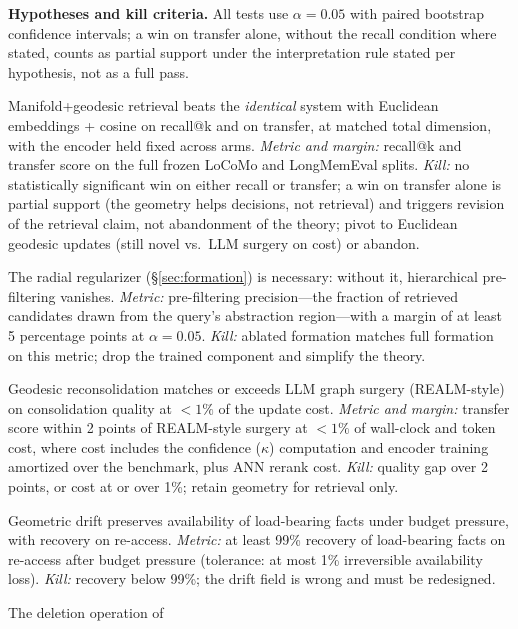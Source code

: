 \documentclass[11pt,a4paper]{article}
\begin{document}
\textbf{Hypotheses and kill criteria.} All tests use $\alpha = 0.05$ with
paired bootstrap confidence intervals; a win on transfer alone, without
the recall condition where stated, counts as partial support under the
interpretation rule stated per hypothesis, not as a full pass.
\begin{description}[leftmargin=*]
\item[H1 (geometry matters).] Manifold+geodesic retrieval beats the
\emph{identical} system with Euclidean embeddings + cosine on recall@k
and on transfer, at matched total dimension, with the encoder held fixed
across arms. \emph{Metric and margin:} recall@k and transfer score on the
full frozen LoCoMo and LongMemEval splits. \emph{Kill:} no statistically
significant win on either recall or transfer; a win on transfer alone is
partial support (the geometry helps decisions, not retrieval) and triggers
revision of the retrieval claim, not abandonment of the theory; pivot to
Euclidean geodesic updates (still novel vs.\ LLM surgery on cost) or
abandon.
\item[H2 (calibrated formation).] The radial regularizer
(\S\ref{sec:formation}) is necessary: without it, hierarchical
pre-filtering vanishes. \emph{Metric:} pre-filtering precision---the
fraction of retrieved candidates drawn from the query's abstraction
region---with a margin of at least 5 percentage points at $\alpha = 0.05$.
\emph{Kill:} ablated formation matches full formation on this metric;
drop the trained component and simplify the theory.
\item[H3 (cheap consolidation).] Geodesic reconsolidation matches or
exceeds LLM graph surgery (REALM-style) on consolidation quality at
$<\!1\%$ of the update cost. \emph{Metric and margin:} transfer score
within 2 points of REALM-style surgery at $<\!1\%$ of wall-clock and
token cost, where cost includes the confidence ($\kappa$) computation and
encoder training amortized over the benchmark, plus ANN rerank cost.
\emph{Kill:} quality gap over 2 points, or cost at or over 1\%;
retain geometry for retrieval only.
\item[H4a (availability).] Geometric drift preserves availability of
load-bearing facts under budget pressure, with recovery on re-access.
\emph{Metric:} at least 99\% recovery of load-bearing facts on re-access
after budget pressure (tolerance: at most 1\% irreversible availability
loss). \emph{Kill:} recovery below 99\%; the drift field is wrong and must
be redesigned.
\item[H4b (deletion).] The deletion operation of

\end{description}
\end{document}
